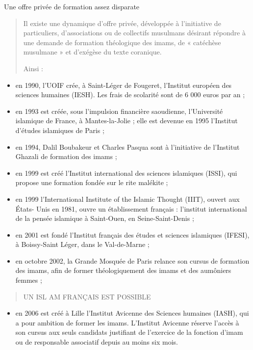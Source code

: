 Une offre privée de formation assez disparate

\begin{quote}
Il existe une dynamique d'offre privée, développée à l'initiative de
particuliers, d'associations ou de collectifs musulmans désirant
répondre à une demande de formation théologique des imams, de «
catéchèse musulmane » et d'exégèse du texte coranique.

Ainsi :
\end{quote}

\begin{itemize}
\item
  en 1990, l'UOIF crée, à Saint-Léger de Fougeret, l'Institut européen
  des sciences humaines (IESH). Les frais de scolarité sont de 6 000
  euros par an ;
\item
  en 1993 est créée, sous l'impulsion financière saoudienne,
  l'Université islamique de France, à Mantes-la-Jolie ; elle est devenue
  en 1995 l'Institut d'études islamiques de Paris ;
\item
  en 1994, Dalil Boubakeur et Charles Pasqua sont à l'initiative de
  l'Institut Ghazali de formation des imams ;
\item
  en 1999 est créé l'Institut international des sciences islamiques
  (ISSI), qui propose une formation fondée sur le rite malékite ;
\item
  en 1999 l'International Institute of the Islamic Thought (IIIT),
  ouvert aux États- Unis en 1981, ouvre un établissement français :
  l'institut international de la pensée islamique à Saint-Ouen, en
  Seine-Saint-Denis ;
\item
  en 2001 est fondé l'Institut français des études et sciences
  islamiques (IFESI), à Boissy-Saint Léger, dans le Val-de-Marne ;
\item
  en octobre 2002, la Grande Mosquée de Paris relance son cursus de
  formation des imams, afin de former théologiquement des imams et des
  aumôniers femmes ;
\end{itemize}

\begin{quote}
UN ISL AM FRANÇAIS EST POSSIBLE
\end{quote}

\begin{itemize}
\item
  en 2006 est créé à Lille l'Institut Avicenne des Sciences humaines
  (IASH), qui a pour ambition de former les imams. L'Institut Avicenne
  réserve l'accès à son cursus aux seuls candidats justifiant de
  l'exercice de la fonction d'imam ou de responsable associatif depuis
  au moins six mois.
\end{itemize}

